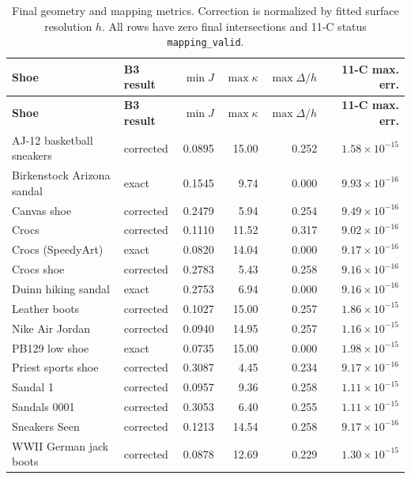 \documentclass[11pt]{article}
\begin{document}
\small
\begin{longtable}{@{}p{}p{}rrrr@{}}
\caption{Final geometry and mapping metrics. Correction is normalized by fitted surface
resolution $h$. All rows have zero final intersections and 11-C status
\texttt{mapping\_valid}.}\label{tab:per-shoe}\\
\toprule
\textbf{Shoe} & \textbf{B3 result} & $\min J$ & $\max\kappa$ & $\max\Delta/h$ & \textbf{11-C max. err.}\\
\midrule
\endfirsthead
\toprule
\textbf{Shoe} & \textbf{B3 result} & $\min J$ & $\max\kappa$ & $\max\Delta/h$ & \textbf{11-C max. err.}\\
\midrule
\endhead
AJ-12 basketball sneakers & corrected & 0.0895 & 15.00 & 0.252 & $1.58\!\times\!10^{-15}$\\
Birkenstock Arizona sandal & exact & 0.1545 & 9.74 & 0.000 & $9.93\!\times\!10^{-16}$\\
Canvas shoe & corrected & 0.2479 & 5.94 & 0.254 & $9.49\!\times\!10^{-16}$\\
Crocs & corrected & 0.1110 & 11.52 & 0.317 & $9.02\!\times\!10^{-16}$\\
Crocs (SpeedyArt) & exact & 0.0820 & 14.04 & 0.000 & $9.17\!\times\!10^{-16}$\\
Crocs shoe & corrected & 0.2783 & 5.43 & 0.258 & $9.16\!\times\!10^{-16}$\\
Duinn hiking sandal & exact & 0.2753 & 6.94 & 0.000 & $9.16\!\times\!10^{-16}$\\
Leather boots & corrected & 0.1027 & 15.00 & 0.257 & $1.86\!\times\!10^{-15}$\\
Nike Air Jordan & corrected & 0.0940 & 14.95 & 0.257 & $1.16\!\times\!10^{-15}$\\
PB129 low shoe & exact & 0.0735 & 15.00 & 0.000 & $1.98\!\times\!10^{-15}$\\
Priest sports shoe & corrected & 0.3087 & 4.45 & 0.234 & $9.17\!\times\!10^{-16}$\\
Sandal 1 & corrected & 0.0957 & 9.36 & 0.258 & $1.11\!\times\!10^{-15}$\\
Sandals 0001 & corrected & 0.3053 & 6.40 & 0.255 & $1.11\!\times\!10^{-15}$\\
Sneakers Seen & corrected & 0.1213 & 14.54 & 0.258 & $9.17\!\times\!10^{-16}$\\
WWII German jack boots & corrected & 0.0878 & 12.69 & 0.229 & $1.30\!\times\!10^{-15}$\\
\bottomrule
\end{longtable}
\normalsize
\end{document}
